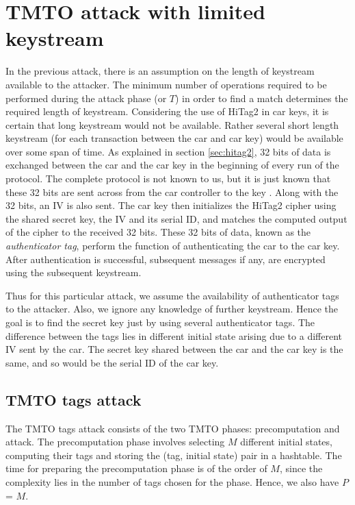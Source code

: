 \section{TMTO attack with limited keystream}

In the previous attack, there is an assumption on the length of keystream available to the attacker. The minimum number of operations required to be performed during the attack phase (or $T$) in order to find a match determines the required length of keystream. Considering the use of HiTag2 in car keys, it is certain that long keystream would not be available. Rather several short length keystream (for each transaction between the car and car key) would be available over some span of time. As explained in section \ref{sec:hitag2}, 32 bits of data is exchanged between the car and the car key in the beginning of every run of the protocol. The complete protocol is not known to us, but it is just known that these 32 bits are sent across from the car controller to the key \cite{email-ruptor}. Along with the 32 bits, an IV is also sent. The car key then initializes the HiTag2 cipher using the shared secret key, the IV and its serial ID, and matches the computed output of the cipher to the received 32 bits. These 32 bits of data, known as the \emph{authenticator tag}, perform the function of authenticating the car to the car key. After authentication is successful, subsequent messages if any, are encrypted using the subsequent keystream.

Thus for this particular attack, we assume the availability of authenticator tags to the attacker. Also, we ignore any knowledge of further keystream. Hence the goal is to find the secret key just by using several authenticator tags. The difference between the tags lies in different initial state arising due to a different IV sent by the car. The secret key shared between the car and the car key is the same, and so would be the serial ID of the car key.

\subsection{TMTO tags attack}

The TMTO tags attack consists of the two TMTO phases: precomputation and attack. The precomputation phase involves selecting $M$ different initial states, computing their tags and storing the (tag, initial state) pair in a hashtable. The time for preparing the precomputation phase is of the order of $M$, since the complexity lies in the number of tags chosen for the phase. Hence, we also have $P$ = $M$.

